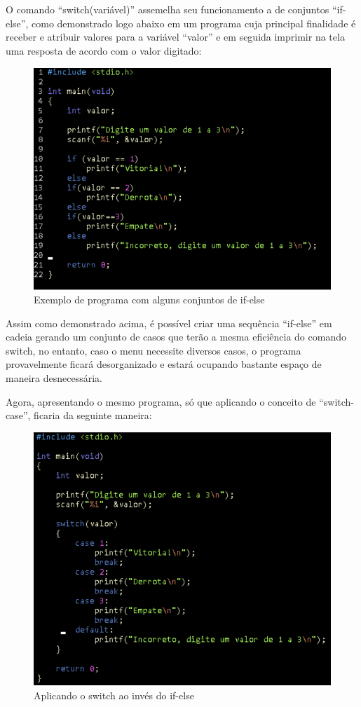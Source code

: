 \documentclass[a4paper,12pt]{article}  %
\begin{document}
   O comando “switch(variável)” assemelha seu funcionamento a de conjuntos “if-else”, como demonstrado logo abaixo em um programa cuja principal finalidade é receber e atribuir valores para a variável “valor” e em seguida imprimir na tela uma resposta de acordo com o valor digitado: 

 \begin{figure}[H]
 \centering
 \includegraphics[width=.80\linewidth]{imagens/ex2.png}
 \caption{Exemplo de programa com alguns conjuntos de if-else}
 \label{fig:xsorta}
\end{figure}

   Assim como demonstrado acima, é possível criar uma sequência “if-else” em cadeia gerando um conjunto de casos que terão a mesma eficiência do comando switch, no entanto, caso o menu necessite diversos casos, o programa provavelmente ficará desorganizado e estará ocupando bastante espaço de maneira desnecessária. \par
   Agora, apresentando o mesmo programa, só que aplicando o conceito de “switch-case”, ficaria da seguinte maneira:

\begin{figure}[H]
 \centering
 \includegraphics[width=.80\linewidth]{imagens/ex3.png}
 \caption{Aplicando o switch ao invés do if-else}
\end{figure}
\end{document}
